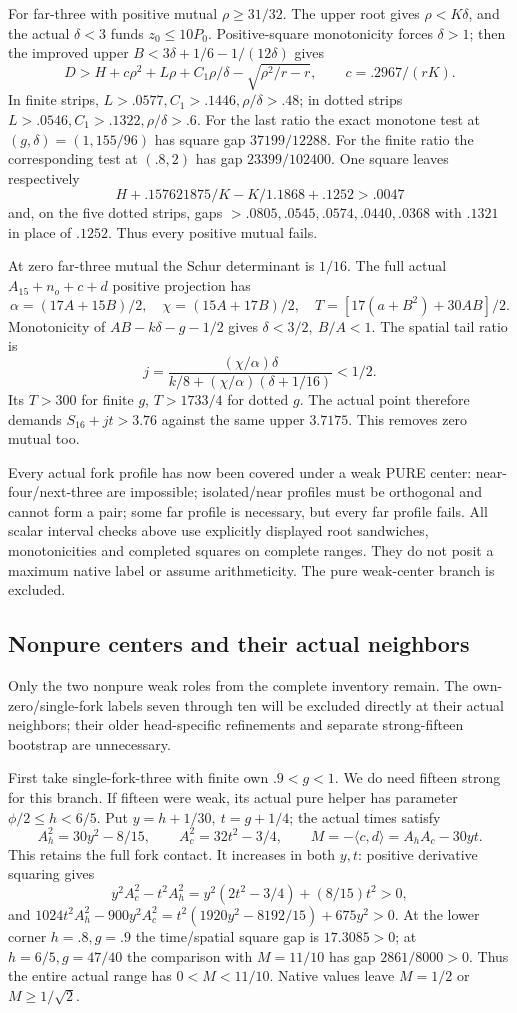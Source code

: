 \documentclass[11pt]{article}
\theoremstyle{definition}
\theoremstyle{remark}
\newcommand{\ip}[2]{\langle #1,#2\rangle}
\begin{document}
For far-three with positive mutual \(\rho\geq31/32\).
The upper root gives \(\rho<K\delta\), and the actual
\(\delta<3\) funds \(z_0\leq10P_0\).
Positive-square monotonicity forces \(\delta>1\);
then the improved upper
\(B<3\delta+1/6-1/(12\delta)\) gives
\[
 D>H+c\rho^2+L\rho+C_1\rho/\delta-\sqrt{\rho^2/r-r},
 \qquad c=.2967/(rK).
\]
In finite strips, \(L>.0577,C_1>.1446,\rho/\delta>.48\);
in dotted strips \(L>.0546,C_1>.1322,\rho/\delta>.6\).
For the last ratio the exact monotone test at
\((g,\delta)=(1,155/96)\) has square gap \(37199/12288\).
For the finite ratio the corresponding test at \((.8,2)\)
has gap \(23399/102400\).
One square leaves respectively
\[
 H+.157621875/K-K/1.1868+.1252>.0047
\]
and, on the five dotted strips, gaps
\(>.0805,.0545,.0574,.0440,.0368\) with \(.1321\)
in place of \(.1252\).
Thus every positive mutual fails.

At zero far-three mutual the Schur determinant is \(1/16\).
The full actual \(A_{15}+n_o+c+d\) positive projection has
\[
 \alpha=(17A+15B)/2,\quad \chi=(15A+17B)/2,\quad
 T=[17(a+B^2)+30AB]/2 .
\]
Monotonicity of \(AB-k\delta-g-1/2\) gives
\(\delta<3/2,\ B/A<1\).
The spatial tail ratio is
\[
 j=\frac{(\chi/\alpha)\delta}
          {k/8+(\chi/\alpha)(\delta+1/16)}<1/2 .
\]
Its \(T>300\) for finite \(g\), \(T>1733/4\) for dotted \(g\).
The actual point therefore demands \(S_{16}+jt>3.76\)
against the same upper \(3.7175\).
This removes zero mutual too.

Every actual fork profile has now been covered under a weak PURE
center: near-four/next-three are impossible; isolated/near profiles
must be orthogonal and cannot form a pair; some far profile is
necessary, but every far profile fails.
All scalar interval checks above use explicitly displayed root
sandwiches, monotonicities and completed squares on complete ranges.
They do not posit a maximum native label or assume arithmeticity.
The pure weak-center branch is excluded.

\subsection{Nonpure centers and their actual neighbors}
\label{app:D18nonpurecenter}
Only the two nonpure weak roles from the complete inventory remain.
The own-zero/single-fork labels seven through ten will be excluded
directly at their actual neighbors; their older head-specific
refinements and separate strong-fifteen bootstrap are unnecessary.

First take single-fork-three with finite own \(.9<g<1\).
We do need fifteen strong for this branch.
If fifteen were weak, its actual pure helper has parameter
\(\phi/2\leq h<6/5\). Put \(y=h+1/30,\ t=g+1/4\);
the actual times satisfy
\[
 A_h^2=30y^2-8/15,\qquad A_c^2=32t^2-3/4,
 \qquad M=-\ip cd=A_hA_c-30yt .
\]
This retains the full fork contact.
It increases in both \(y,t\): positive derivative squaring gives
\[
 y^2A_c^2-t^2A_h^2=y^2(2t^2-3/4)+(8/15)t^2>0,
\]
and
\(1024t^2A_h^2-900y^2A_c^2
=t^2(1920y^2-8192/15)+675y^2>0\).
At the lower corner \(h=.8,g=.9\) the time/spatial square
gap is \(17.3085>0\); at \(h=6/5,g=47/40\) the comparison
with \(M=11/10\) has gap \(2861/8000>0\).
Thus the entire actual range has \(0<M<11/10\).
Native values leave \(M=1/2\) or \(M\geq1/\sqrt2\).
\end{document}

